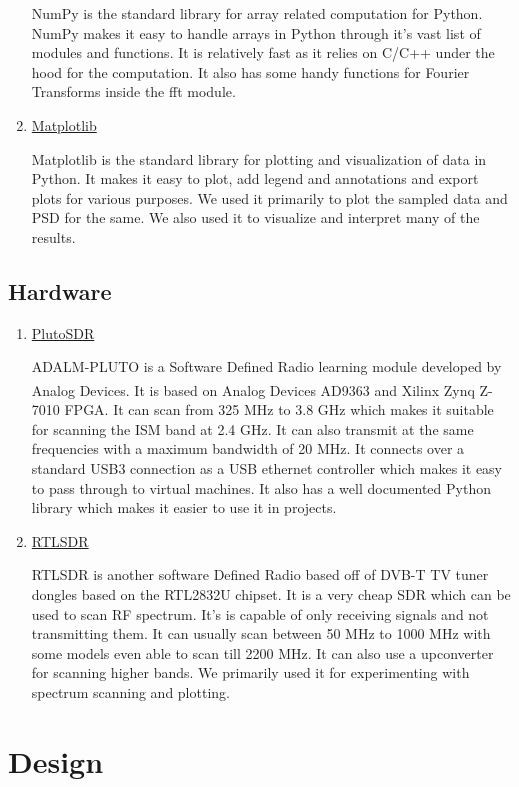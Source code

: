 \begin{enumerate}
  NumPy is the standard library for array related computation for Python. NumPy makes it easy to handle arrays in Python through it's vast list of modules and functions. It is relatively fast as it relies on C/C++ under the hood for the computation. It also has some handy functions for Fourier Transforms inside the fft module. 

\item \underline{Matplotlib}

  Matplotlib is the standard library for plotting and visualization of data in Python. It makes it easy to plot, add legend and annotations and export plots for various purposes. We used it primarily to plot the sampled data and PSD for the same. We also used it to visualize and interpret many of the results.
\end{enumerate}

\subsection{Hardware}
\begin{enumerate}
\item \underline{PlutoSDR}

ADALM-PLUTO is a Software Defined Radio learning module developed by Analog Devices. It is based on Analog Devices AD9363 and Xilinx\textsuperscript{\textregistered} Zynq Z-7010 FPGA. It  can scan from 325 MHz to 3.8 GHz which makes it suitable for scanning the ISM band at 2.4 GHz. It can also transmit at the same frequencies with a maximum bandwidth of 20 MHz. It connects over a standard USB3 connection as a USB ethernet controller which makes it easy to pass through to virtual machines. It also has a well documented Python library which makes it easier to use it in projects. 

\item \underline{RTLSDR}

RTLSDR is another software  Defined Radio based off of DVB-T TV tuner dongles based on the RTL2832U chipset. It is a very cheap SDR which can be used to scan RF spectrum. It's is capable of only receiving signals and not transmitting them. It can usually scan between 50 MHz to 1000 MHz with some models even able to scan till 2200 MHz. It can also use a upconverter for scanning higher bands. We primarily used it for experimenting with spectrum scanning and plotting.

\end{enumerate}
\section{Design} \label{Design}

